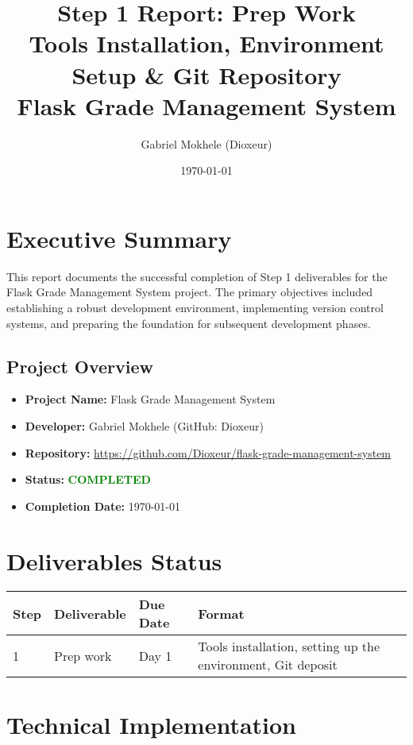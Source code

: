 \documentclass[12pt,a4paper]{article}
\title{\textbf{Step 1 Report: Prep Work} \\ 
       \large Tools Installation, Environment Setup \& Git Repository \\
       \vspace{0.5cm}
       \large Flask Grade Management System}
\author{Gabriel Mokhele (Dioxeur)}
\date{\today}
\begin{document}
\maketitle
\thispagestyle{empty}

\newpage

\tableofcontents
\newpage

\section{Executive Summary}

This report documents the successful completion of Step 1 deliverables for the Flask Grade Management System project. The primary objectives included establishing a robust development environment, implementing version control systems, and preparing the foundation for subsequent development phases.

\subsection{Project Overview}
\begin{itemize}
    \item \textbf{Project Name:} Flask Grade Management System
    \item \textbf{Developer:} Gabriel Mokhele (GitHub: Dioxeur)
    \item \textbf{Repository:} \url{https://github.com/Dioxeur/flask-grade-management-system}
    \item \textbf{Status:} \textcolor{green}{\textbf{COMPLETED}}
    \item \textbf{Completion Date:} \today
\end{itemize}

\section{Deliverables Status}

\begin{longtable}{|p{2cm}|p{4cm}|p{2cm}|p{6cm}|}
\hline
\textbf{Step} & \textbf{Deliverable} & \textbf{Due Date} & \textbf{Format} \\
\hline
\endhead
1 & Prep work & Day 1 & Tools installation, setting up the environment, Git deposit \\
\hline
\end{longtable}

\section{Technical Implementation}
\end{document}
